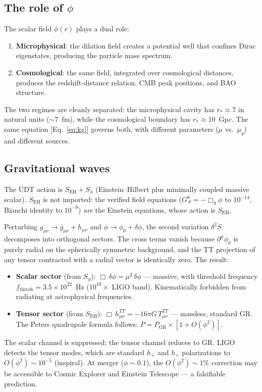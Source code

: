 \documentclass[aps,prd,twocolumn,superscriptaddress,nofootinbib,longbibliography]{revtex4-2}
\newcommand{\rstar}{r_{*}}
\newcommand{\mug}{\mu_g}
\begin{document}
\subsection{The role of $\phi$}

The scalar field $\phi(r)$ plays a dual role:
\begin{enumerate}
\item \textbf{Microphysical}: the dilation field creates a potential
  well that confines Dirac eigenstates, producing the particle mass
  spectrum.
\item \textbf{Cosmological}: the same field, integrated over
  cosmological distances, produces the redshift-distance relation,
  CMB peak positions, and BAO structure.
\end{enumerate}
The two regimes are cleanly separated: the microphysical cavity has
$\rstar \approx 7$ in natural units ($\sim 7$~fm), while the
cosmological boundary has $\rstar \approx 10$~Gpc.  The same equation
[Eq.~\eqref{eq:kg}] governs both, with different parameters
($\mu$ vs.\ $\mug$) and different sources.

\subsection{Gravitational waves}

The UDT action is $S_\mathrm{EH} + S_\phi$ (Einstein--Hilbert plus
minimally coupled massive scalar).  $S_\mathrm{EH}$ is not imported:
the verified field equations ($G^\theta_{\ \theta} = -\Box_g\phi$ to
$10^{-14}$, Bianchi identity to $10^{-9}$) \emph{are} the Einstein
equations, whose action is $S_\mathrm{EH}$.

Perturbing $g_{\mu\nu} \to \bar{g}_{\mu\nu} + h_{\mu\nu}$ and
$\phi \to \phi_0 + \delta\phi$, the second variation $\delta^2 S$
decomposes into orthogonal sectors.  The cross terms vanish because
$\partial^\mu\phi_0$ is purely radial on the spherically symmetric
background, and the TT projection of any tensor contracted with a
radial vector is identically zero.  The result:
\begin{itemize}
\item \textbf{Scalar sector} (from $S_\phi$):
  $\Box\,\delta\phi = \mu^2\,\delta\phi$ --- massive, with threshold
  frequency $f_\mathrm{thresh} = 3.5 \times 10^{22}$~Hz
  ($10^{19}\times$ LIGO band).  Kinematically forbidden from
  radiating at astrophysical frequencies.
\item \textbf{Tensor sector} (from $S_\mathrm{EH}$):
  $\Box\,h^{TT}_{\mu\nu} = -16\pi G\,T^{TT}_{\mu\nu}$ --- massless,
  standard GR.  The Peters quadrupole formula follows:
  $P = P_\mathrm{GR} \times [1 + O(\phi^2)]$.
\end{itemize}
The scalar channel is suppressed; the tensor channel reduces to GR.  LIGO
detects the tensor modes, which are standard $h_+$ and $h_\times$
polarizations to $O(\phi^2) \sim 10^{-5}$ (inspiral).  At merger
($\phi \sim 0.1$), the $O(\phi^2) \sim 1\%$ correction may be
accessible to Cosmic Explorer and Einstein Telescope --- a falsifiable
prediction.
\end{document}
